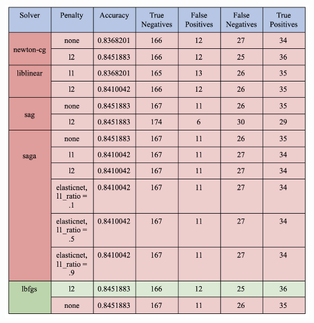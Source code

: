 \documentclass{article}
\begin{document}
\begin{center}
\includegraphics[scale=.55]{solver_results.png}\\
\end{center}
\end{document}
